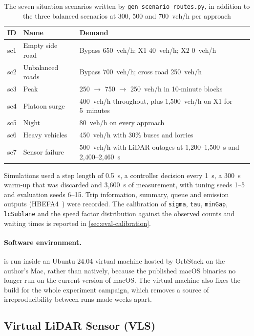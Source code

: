 \begin{table}[htbp]
\centering
\caption{The seven situation scenarios written by \texttt{gen\_scenario\_routes.py}, in addition to the three
balanced scenarios at 300, 500 and 700~veh/h per approach}\label{tab:impl-scenarios}
\small
\begin{tabularx}{\textwidth}{@{}llX@{}}
\toprule
ID & Name & Demand\\
\midrule
sc1 & Empty side road & Bypass 650~veh/h; X1 40~veh/h; X2 0~veh/h\\
sc2 & Unbalanced roads & Bypass 700~veh/h; cross road 250~veh/h\\
sc3 & Peak & 250 $\rightarrow$ 750 $\rightarrow$ 250~veh/h in 10-minute blocks\\
sc4 & Platoon surge & 400~veh/h throughout, plus 1,500~veh/h on X1 for 5~minutes\\
sc5 & Night & 80~veh/h on every approach\\
sc6 & Heavy vehicles & 450~veh/h with 30\% buses and lorries\\
sc7 & Sensor failure & 500~veh/h with LiDAR outages at 1,200--1,500~s and 2,400--2,460~s\\
\bottomrule
\end{tabularx}
\end{table}

Simulations used a step length of 0.5~s, a controller decision every 1~s, a 300~s
warm-up that was discarded and 3,600~s of measurement, with tuning seeds 1--5 and evaluation seeds
6--15. Trip information, summary, queue and emission outputs (HBEFA4~\cite{hbefa41}) were recorded.
The calibration of \texttt{sigma}, \texttt{tau}, \texttt{minGap}, \texttt{lcSublane} and the speed
factor distribution against the observed counts and waiting times is reported in
\cref{sec:eval-calibration}.

\paragraph{Software environment.} \sumo{}  is run inside an Ubuntu 24.04 virtual machine hosted by
OrbStack on the author's Mac, rather than natively, because the published macOS binaries no longer run on the
current version of macOS. The virtual machine also fixes the \sumo{} build for the whole experiment campaign,
which removes a source of irreproducibility between runs made weeks apart.

\subsection{Virtual LiDAR Sensor (VLS)}\label{sec:impl-vls}

